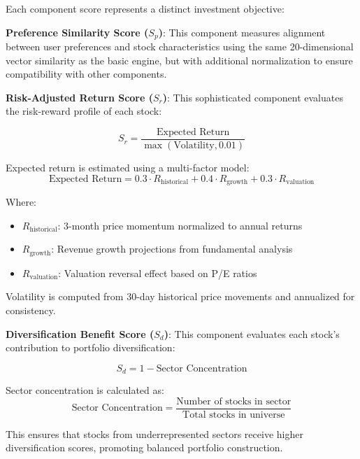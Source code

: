 Each component score represents a distinct investment objective:

\textbf{Preference Similarity Score ($S_p$)}:
This component measures alignment between user preferences and stock characteristics using the same 20-dimensional vector similarity as the basic engine, but with additional normalization to ensure compatibility with other components.

\textbf{Risk-Adjusted Return Score ($S_r$)}:
This sophisticated component evaluates the risk-reward profile of each stock:

\begin{equation}
S_r = \frac{\text{Expected Return}}{\max(\text{Volatility}, 0.01)}
\end{equation}

Expected return is estimated using a multi-factor model:
\begin{equation}
\text{Expected Return} = 0.3 \cdot R_{\text{historical}} + 0.4 \cdot R_{\text{growth}} + 0.3 \cdot R_{\text{valuation}}
\end{equation}

Where:
\begin{itemize}
\item $R_{\text{historical}}$: 3-month price momentum normalized to annual returns
\item $R_{\text{growth}}$: Revenue growth projections from fundamental analysis
\item $R_{\text{valuation}}$: Valuation reversal effect based on P/E ratios
\end{itemize}

Volatility is computed from 30-day historical price movements and annualized for consistency.

\textbf{Diversification Benefit Score ($S_d$)}:
This component evaluates each stock's contribution to portfolio diversification:

\begin{equation}
S_d = 1 - \text{Sector Concentration}
\end{equation}

Sector concentration is calculated as:
\begin{equation}
\text{Sector Concentration} = \frac{\text{Number of stocks in sector}}{\text{Total stocks in universe}}
\end{equation}

This ensures that stocks from underrepresented sectors receive higher diversification scores, promoting balanced portfolio construction.

